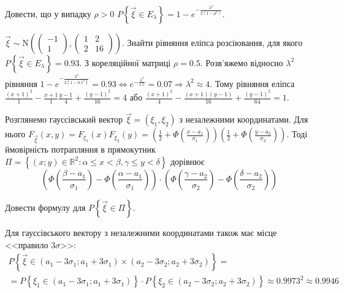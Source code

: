 \begin{exercise}
    Довести, що у випадку $\rho > 0$ $P\left\{\vec{\xi} \in E_\lambda\right\} = 
    1 - e^{-\frac{\lambda^2}{2(1-\rho^2)}}$.
\end{exercise}

\begin{example}
    $\vec{\xi} \sim \mathrm{N}\left( \begin{pmatrix}
        -1 \\ 1
    \end{pmatrix}, \begin{pmatrix}
        1 & 2 \\
        2 & 16
    \end{pmatrix}\right)$. Знайти рівняння еліпса розсіювання, для якого \\
    $P\left\{\vec{\xi} \in E_\lambda\right\} = 0.93$. З кореляційної матриці $\rho = 0.5$.
    Розв'яжемо відносно $\lambda^2$ рівняння $1 - e^{-\frac{\lambda^2}{2(1-0.5^2)}} = 0.93
    \Leftrightarrow e^{-\frac{\lambda^2}{1.5}} = 0.07 \Rightarrow \lambda^2 \approx 4$. Тому рівняння еліпса
    $\frac{(x+1)^2}{1} - \frac{x+1}{1} \frac{y-1}{4} + \frac{(y-1)^2}{16} = 4$ або 
    $\frac{(x+1)^2}{4} - \frac{(x+1)(y-1)}{16} + \frac{(y-1)^2}{64} = 1$.
\end{example}

Розглянемо гауссівський вектор $\vec{\xi} = (\xi_1, \xi_2)$ з незалежними координатами.
Для нього $F_{\vec{\xi}}(x,y) = F_{\xi_1}(x) F_{\xi_2}(y) = 
\left(\frac{1}{2} + \Phi\left( \frac{x-a_1}{\sigma_1}\right) \right)
\left(\frac{1}{2} + \Phi\left( \frac{y-a_2}{\sigma_2}\right) \right)$.
Тоді ймовірність потрапляння в прямокутник $\Pi = \left\{(x;y)\in\mathbb{R}^2 : \alpha \leq x < \beta, \gamma \leq y < \delta\right\}$
дорівнює $$\left( \Phi\left( \frac{\beta-a_1}{\sigma_1}\right) - \Phi\left( \frac{\alpha-a_1}{\sigma_1}\right)\right) \cdot
\left( \Phi\left( \frac{\gamma-a_2}{\sigma_2}\right) - \Phi\left( \frac{\delta-a_2}{\sigma_2}\right)\right)$$
\begin{exercise}
    Довести формулу для $P\left\{\vec{\xi}\in\Pi\right\}$.
\end{exercise}
Для гауссівського вектору з незалежними координатами також має місце <<правило $3\sigma$>>:
\begin{gather*}
    P\left\{\vec{\xi} \in (a_1-3\sigma_1; a_1+3\sigma_1)\times(a_2-3\sigma_2; a_2+3\sigma_2)\right\} = \\
    = P\left\{\xi_1 \in(a_1-3\sigma_1; a_1+3\sigma_1)\right\}\cdot P\left\{\xi_2 \in(a_2-3\sigma_2; a_2+3\sigma_2)\right\}
    \approx 0.9973^2 \approx 0.9946
\end{gather*}

